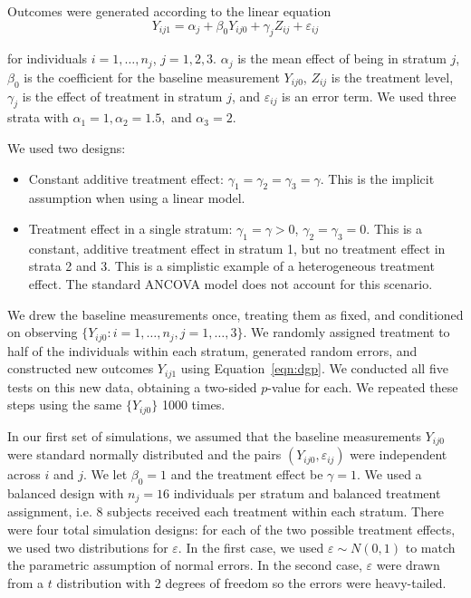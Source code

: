 \documentclass[12pt]{article}
\begin{document}
Outcomes were generated according to the linear equation 
\begin{equation}\label{eqn:dgp}
Y_{ij1} =\alpha_j + \beta_0Y_{ij0} + \gamma_j Z_{ij} + \varepsilon_{ij}
\end{equation}

\noindent for individuals $i = 1, \dots, n_j$, $j = 1, 2, 3$.
$\alpha_j$ is the mean effect of being in stratum $j$, 
$\beta_0$ is the coefficient for the baseline measurement $Y_{ij0}$, 
$Z_{ij}$ is the treatment level, 
$\gamma_j$ is the effect of treatment in stratum $j$, 
and $\varepsilon_{ij}$ is an error term.
We used three strata with $\alpha_1 = 1, \alpha_2 = 1.5,$ and $\alpha_3 = 2$.

We used two designs:
\begin{itemize}
\item Constant additive treatment effect: $\gamma_1 = \gamma_2 = \gamma_3 = \gamma$. This is the implicit assumption when using a linear model.
\item Treatment effect in a single stratum: $\gamma_1 = \gamma > 0$, $\gamma_2 = \gamma_3 = 0$. This is a constant, additive treatment effect in stratum 1, but no treatment effect in strata 2 and 3. This is a simplistic example of a heterogeneous treatment effect. The standard ANCOVA model does not account for this scenario.
\end{itemize}

\noindent We drew the baseline measurements once, treating them as fixed, and conditioned on observing $\{ Y_{ij0} : {i = 1,\dots,n_j, j = 1,\dots, 3}\}$.
We randomly assigned treatment to half of the individuals within each stratum, generated random errors, and constructed new outcomes $Y_{ij1}$ using Equation~\ref{eqn:dgp}.
We conducted all five tests on this new data, obtaining a two-sided $p$-value for each.
We repeated these steps using the same $\{ Y_{ij0} \}$ 1000 times.

In our first set of simulations, we assumed that the baseline measurements $Y_{ij0}$ were standard normally distributed and the pairs $(Y_{ij0}, \varepsilon_{ij})$ were independent across $i$ and $j$.
We let $\beta_0 = 1$ and the treatment effect be $\gamma = 1$.
We used a balanced design with $n_j = 16$ individuals per stratum and balanced treatment assignment, i.e. 8 subjects received each treatment within each stratum.
There were four total simulation designs:
for each of the two possible treatment effects, we used two distributions for $\varepsilon$.
In the first case, we used $\varepsilon \sim N(0, 1)$ to match the parametric assumption of normal errors.
In the second case, $\varepsilon$ were drawn from a $t$ distribution with 2 degrees of freedom so the errors were heavy-tailed.
\end{document}

